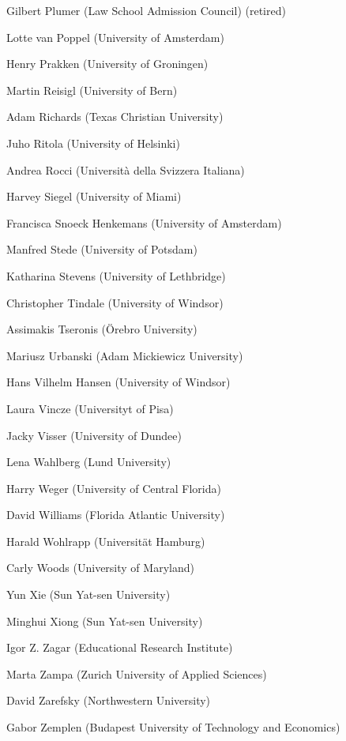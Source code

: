 \begin{compactitem}[]
		\item[] Gilbert Plumer (Law School Admission Council) (retired)
		\item[] Lotte van Poppel (University of Amsterdam)
		\item[] Henry Prakken (University of Groningen)
		\item[] Martin Reisigl (University of Bern)
		\item[] Adam Richards (Texas Christian University)
		\item[] Juho Ritola (University of Helsinki)
		\item[] Andrea Rocci (Università della Svizzera Italiana)
		\item[] Harvey Siegel (University of Miami)
		\item[] Francisca Snoeck Henkemans (University of Amsterdam)
		\item[] Manfred Stede (University of Potsdam)
		\item[] Katharina Stevens (University of Lethbridge)
		\item[] Christopher Tindale (University of Windsor)
		\item[] Assimakis Tseronis (Örebro University)
		\item[] Mariusz Urbanski (Adam Mickiewicz University)
		\item[] Hans Vilhelm Hansen (University of Windsor)
		\item[] Laura Vincze (Universityt of Pisa)
		\item[] Jacky Visser (University of Dundee)
		\item[] Lena Wahlberg (Lund University)
		\item[] Harry Weger (University of Central Florida)
		\item[] David Williams (Florida Atlantic University)
		\item[] Harald Wohlrapp (Universität Hamburg)
		\item[] Carly Woods (University of Maryland)
		\item[] Yun Xie (Sun Yat-sen University)
		\item[] Minghui Xiong (Sun Yat-sen University)
		\item[] Igor Z. Zagar (Educational Research Institute)
		\item[] Marta Zampa (Zurich University of Applied Sciences)
		\item[] David Zarefsky (Northwestern University)
		\item[] Gabor Zemplen (Budapest University of Technology and Economics)
	\end{compactitem}

